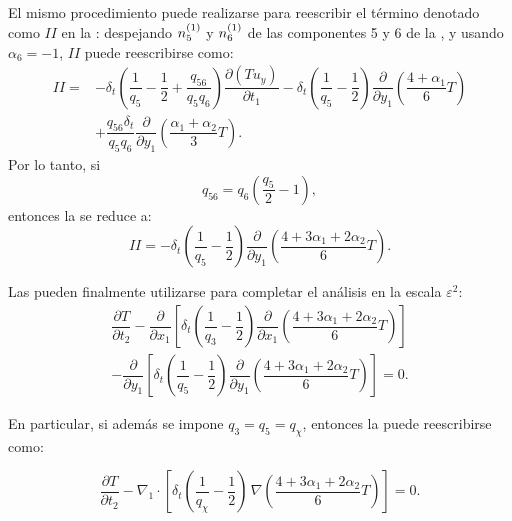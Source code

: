 El mismo procedimiento puede realizarse para reescribir el término denotado como $II$ en la : despejando $n_{5}^{(1)}$ y $n_{6}^{(1)}$ de las componentes 5 y 6 de la , y usando $\alpha_6=-1$, $II$ puede reescribirse como:
\begin{equation}
\begin{aligned}
	II =& -\delta_t \left( \dfrac{1}{q_5} - \dfrac{1}{2}  + \dfrac{q_{56}}{q_5 q_6}  \right) \dfrac{\partial (Tu_y)}{\partial t_1} - \delta_t \left( \dfrac{1}{q_5} - \dfrac{1}{2} \right) \dfrac{\partial}{\partial y_1} \left(\dfrac{4+\alpha_1}{6} T \right) \\
	&+ \dfrac{q_{56}\delta_t}{q_5q_6}\dfrac{\partial}{\partial y_1} \left(\dfrac{\alpha_1+\alpha_2}{3} T \right).
	\label{eq:II_0}
\end{aligned}
\end{equation}
Por lo tanto, si 
\begin{equation}
	q_{56} = q_6 \left( \dfrac{q_5}{2} - 1 \right),
\end{equation}
entonces la  se reduce a:
\begin{equation}
	II = -\delta_t \left( \dfrac{1}{q_5} - \dfrac{1}{2} \right) \dfrac{\partial}{\partial y_1} \left(\dfrac{4+3\alpha_1 + 2\alpha_2}{6} T \right).
	\label{eq:II_1}
\end{equation}

Las  pueden finalmente utilizarse para completar el an\'alisis en la escala $\varepsilon^2$:
\begin{equation}
	\begin{split}
	\dfrac{\partial T}{\partial t_2} -
	\dfrac{\partial}{\partial x_1}\left[ \delta_t \left( \dfrac{1}{q_3} - \dfrac{1}{2} \right) \dfrac{\partial}{\partial x_1} \left(\dfrac{4+3\alpha_1 + 2\alpha_2}{6} T \right) \right]	\\
	-  \dfrac{\partial}{\partial y_1}\left[ \delta_t \left( \dfrac{1}{q_5} - \dfrac{1}{2} \right) \dfrac{\partial}{\partial y_1} \left(\dfrac{4+3\alpha_1 + 2\alpha_2}{6} T \right) \right] = 0.
	\end{split}
	\label{eq:eps_2_clean}
\end{equation}

En particular, si adem\'as se impone $q_3=q_5=q_{\chi}$, entonces la  puede reescribirse como:

\begin{equation}
	\dfrac{\partial T}{\partial t_2} - \nabla_1 \cdot \left[ \delta_t \left( \dfrac{1}{q_{\chi}} - \dfrac{1}{2} \right) \, \nabla\left( \dfrac{4+3\alpha_1 + 2\alpha_2}{6} T \right) \right]  = 0.
	\label{eq:T_eps_2}
\end{equation}

